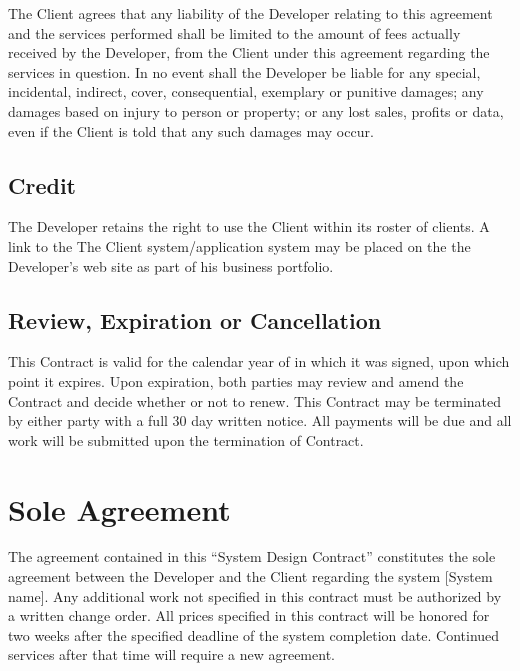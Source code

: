 \documentclass[a4paper,12pt]{article} %
\begin{document}
The Client agrees that any liability of the Developer relating to this agreement and the services performed shall be limited to the amount of fees actually received by the Developer, from the Client under this agreement regarding the services in question. In no event shall the Developer be liable for any special, incidental, indirect, cover, consequential, exemplary or punitive damages; any damages based on injury to person or property; or any lost sales, profits or data, even if the Client is told that any such damages may occur.


\subsection{Credit}

The Developer retains the right to use the Client within its roster of clients. A link to the The Client system/application system may be placed on the the Developer's web site as part of his business portfolio.


\subsection{Review, Expiration or Cancellation}

This Contract is valid for the calendar year of in which it was signed, upon which point it expires. Upon expiration, both parties may review and amend the Contract and decide whether or not to renew. This Contract may be terminated by either party with a full 30 day written notice. All payments will be due and all work will be submitted upon the termination of Contract.


\section{Sole Agreement}

The agreement contained in this ``System Design Contract'' constitutes the sole agreement between the Developer and the Client regarding the system [System name]. Any additional work not specified in this contract must be authorized by a written change order. All prices specified in this contract will be honored for two weeks after the specified deadline of the system completion date. Continued services after that time will require a new agreement.
\end{document}
